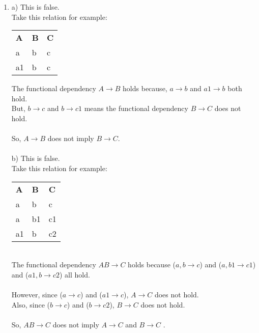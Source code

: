 \documentclass{article}
\begin{document}
\begin{enumerate}
    \item %
    a) This is false. 
    \\ Take this relation for example:
  
    	\begin{table}[h]
    	\centering
		\begin{tabular}{lll}
		\textbf{A}&\textbf{B}&\textbf{C}\\
		a  & b & c \\
		a1 & b & c
		\end{tabular}
		\end{table}
		The functional dependency $A \rightarrow B$ holds because, $a \rightarrow b$ and $a1 \rightarrow b$  both hold.
		\\
		But, $b \rightarrow c$ and $b \rightarrow c1$ means the  functional dependency $B \rightarrow C$ does not hold.
		\\ \\
		So,  $A \rightarrow B$ does not imply $B \rightarrow C$.
		\\ \\
		b) This is false.
		\\ Take this relation for example:
		\begin{table}[h]
		  \centering
		\begin{tabular}{lll}
			\textbf{A}&\textbf{B}&\textbf{C}\\
			a  & b  & c  \\
			a  & b1 & c1 \\	
			a1 & b  & c2
		\end{tabular}
		\end{table}
		\\
		The functional dependency $AB \rightarrow C$ holds because ($a,b \rightarrow c$) and ($a,b1 \rightarrow c1$) and ($a1,b \rightarrow c2$) all hold.
		\\
		\\
		However, since ($a \rightarrow c$) and ($a1 \rightarrow c$),
		$A \rightarrow C$ does not hold. \\
		Also, since ($b \rightarrow c$) and ($b \rightarrow c2$),
		$B \rightarrow C$ does not hold.
		\\ \\
		So,  $AB \rightarrow C$ does not imply $A \rightarrow C$ and $B \rightarrow C$ .
		

\end{enumerate}
\end{document}
